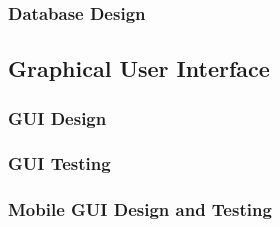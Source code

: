 \documentclass[review]{cmpreport}
\begin{document}
	\subsubsection{Database Design}

	\subsection{Graphical User Interface} \label{GUIs}
	\subsubsection{GUI Design}
	\subsubsection{GUI Testing}
	\subsubsection{Mobile GUI Design and Testing}
	
\end{document}
